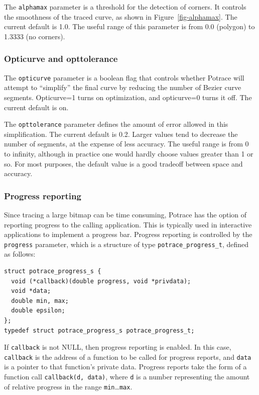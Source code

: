 \documentclass{article}
\begin{document}
The \verb!alphamax! parameter is a threshold for the detection of
corners. It controls the smoothness of the traced curve, as shown in
Figure~\ref{fig-alphamax}. The current default is 1.0.  The useful range of
this parameter is from 0.0 (polygon) to 1.3333 (no corners).

\subsubsection{Opticurve and opttolerance}

The \verb!opticurve! parameter is a boolean flag that controls whether
Potrace will attempt to ``simplify'' the final curve by reducing the
number of Bezier curve segments. Opticurve=1 turns on optimization,
and opticurve=0 turns it off. The current default is on. 

The \verb!opttolerance! parameter defines the amount of error allowed
in this simplification. The current default is 0.2. Larger values tend to
decrease the number of segments, at the expense of less accuracy.  The
useful range is from 0 to infinity, although in practice one would
hardly choose values greater than 1 or so. For most purposes, the
default value is a good tradeoff between space and accuracy.

\subsubsection{Progress reporting}

Since tracing a large bitmap can be time consuming, Potrace has the
option of reporting progress to the calling application. This is
typically used in interactive applications to implement a progress
bar. Progress reporting is controlled by the \verb!progress!
parameter, which is a structure of type \verb!potrace_progress_t!,
defined as follows:

\begin{verbatim}
struct potrace_progress_s {
  void (*callback)(double progress, void *privdata);
  void *data;      
  double min, max; 
  double epsilon;      
};
typedef struct potrace_progress_s potrace_progress_t;
\end{verbatim}

If \verb!callback! is not NULL, then progress reporting is enabled.
In this case, \verb!callback! is the address of a function to be
called for progress reports, and \verb!data! is a pointer to that
function's private data.  Progress reports take the form of a function
call \verb!callback(d, data)!, where \verb!d! is a number representing
the amount of relative progress in the range
\verb!min!\ldots\verb!max!. 
\end{document}
